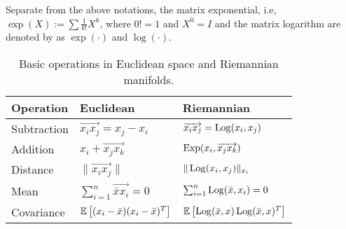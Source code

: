 Separate from the above notations, the matrix exponential, i.e, $\exp(X):= \sum \frac{1}{k!} X^k$, where $0!=1$ and $X^0=I$  and the matrix logarithm are denoted by as $\exp(\cdot)$ and $\log(\cdot)$. 


\renewcommand{\arraystretch}{1.5}
\begin{table}[!b]
{\footnotesize
\begin{center}
    \begin{tabular}{| l | l | l | }
    \hline
    Operation & Euclidean & Riemannian  \\  \hline 
    \footnotesize Subtraction & $\overrightarrow{x_i x_j} = x_j - x_i$ & $\overrightarrow{x_i x_j} = \operatorname*{Log}(x_i,x_j)$ \\ 
    \footnotesize Addition & $x_i + \overrightarrow{x_j x_k}$ & $\operatorname*{Exp}(x_i,\overrightarrow{x_j x_k})$ \\     
    \footnotesize Distance  & $\| \overrightarrow{x_i x_j} \|$ & $\|\operatorname*{Log}(x_i,x_j) \|_{x_i}$ \\ 
    Mean  & $\sum_{i=1}^{n} \overrightarrow{\bar{x}x_{i}}=0$ & \footnotesize $\sum_{i=1}^{n} \operatorname*{Log}(\bar{x}, x_i)=0$  \\ 
    Covariance & \footnotesize$\mathbb{E} \left [ (x_i - \bar{x})(x_i - \bar{x})^{T} \right ]$&\footnotesize $\mathbb{E} \left [ \operatorname*{Log}(\bar{x}, x)\operatorname*{Log}(\bar{x}, x)^{T} \right ]$\\ [1ex] \hline 
  \end{tabular}
\end{center}
}
\caption[Basic operations on Riemannian manifolds]{Basic operations in Euclidean space and Riemannian manifolds.}
\label{tab:comp}
\end{table}

